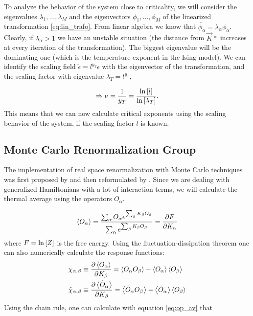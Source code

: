 \vspace{0.2cm}


To analyze the behavior of the system close to criticality, we will consider the eigenvalues $\lambda_1,...,\lambda_M$ and the eigenvectors $\phi_1,...,\phi_M$ of the linearized transformation \ref{eq:lin_trafo}. From linear algebra we know that $\tilde{\phi_\alpha}=\lambda_\alpha\phi_\alpha$. Clearly, if $\lambda_\alpha>1$ we have an unstable situation (the distance from $\vec{K}*$ increases at every iteration of the transformation). The biggest eigenvalue will be the dominating one (which is the temperature exponent in the Ising model). We can identify the scaling field $\tilde{\epsilon}=l^{y_T}\epsilon$ with the eigenvector of the transformation, and the scaling factor with eigenvalue $\lambda_T = l^{y_T}$,

$$
\Rightarrow \nu = \frac{1}{y_T}=\frac{\text{ln}\left[l\right]}{\text{ln}\left[\lambda_T\right]}.
$$
This means that we can now calculate critical exponents using the scaling behavior of the system, if the scaling factor $l$ is known. 





\subsection{Monte Carlo Renormalization Group}
\label{subsec:MCRG}

The implementation of real space renormalization with Monte Carlo techniques was first proposed by  \citet{ma_renorm} and then reformulated by \citet{swendsen_renorm}. Since we are dealing with generalized Hamiltonians with a lot of interaction terms, we will calculate the thermal average using the operators $O_\alpha$.

\begin{equation}
\left<O_{\alpha}\right> =
\frac    {\sum_\alpha {O_\alpha e^{\sum_\beta {K_\beta O_\beta}} }  }   {\sum_\alpha {e^{\sum_\beta {K_\beta O_\beta}}}  } =
\frac{\partial F}{\partial K_\alpha}
\label{eq:op_av}
\end{equation}
where $F=\text{ln}\left[Z\right]$ is the free energy. Using the fluctuation-dissipation theorem one can also numerically calculate the response functions:
\begin{align*}
\chi_{\alpha,\beta} &\equiv \frac{\partial \left<O_\alpha\right>}{\partial K_\beta} = \left<O_\alpha O_\beta\right> -\left<O_\alpha \right>\left< O_\beta\right>\\
\tilde{\chi}_{\alpha,\beta} &\equiv \frac{\partial \left<\tilde{O}_\alpha\right>}{\partial K_\beta} = \left<\tilde{O}_\alpha O_\beta\right> -\left<\tilde{O}_\alpha \right>\left< O_\beta\right>
\end{align*}
Using the chain rule,  one can calculate with equation \eqref{eq:op_av} that



